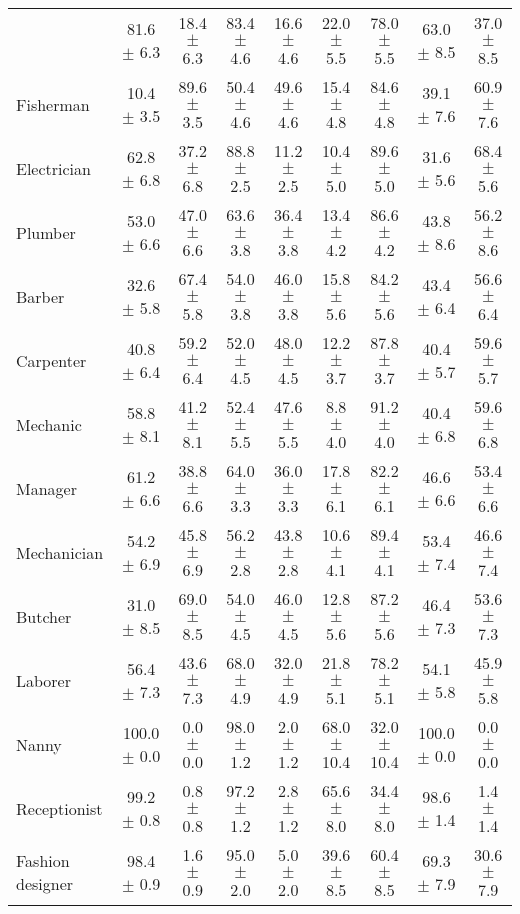 \begin{table*}[p]
{\begin{tabular}{l|cc|cc|cc|cc}
& 81.6 $\pm$ 6.3 & 18.4 $\pm$ 6.3
& 83.4 $\pm$ 4.6 & 16.6 $\pm$ 4.6
& 22.0 $\pm$ 5.5 & 78.0 $\pm$ 5.5
& 63.0 $\pm$ 8.5 & 37.0 $\pm$ 8.5
\\
Fisherman
& 10.4 $\pm$ 3.5 & 89.6 $\pm$ 3.5
& 50.4 $\pm$ 4.6 & 49.6 $\pm$ 4.6
& 15.4 $\pm$ 4.8 & 84.6 $\pm$ 4.8
& 39.1 $\pm$ 7.6 & 60.9 $\pm$ 7.6
\\
Electrician
& 62.8 $\pm$ 6.8 & 37.2 $\pm$ 6.8
& 88.8 $\pm$ 2.5 & 11.2 $\pm$ 2.5
& 10.4 $\pm$ 5.0 & 89.6 $\pm$ 5.0
& 31.6 $\pm$ 5.6 & 68.4 $\pm$ 5.6
\\
Plumber
& 53.0 $\pm$ 6.6 & 47.0 $\pm$ 6.6
& 63.6 $\pm$ 3.8 & 36.4 $\pm$ 3.8
& 13.4 $\pm$ 4.2 & 86.6 $\pm$ 4.2
& 43.8 $\pm$ 8.6 & 56.2 $\pm$ 8.6
\\
Barber
& 32.6 $\pm$ 5.8 & 67.4 $\pm$ 5.8
& 54.0 $\pm$ 3.8 & 46.0 $\pm$ 3.8
& 15.8 $\pm$ 5.6 & 84.2 $\pm$ 5.6
& 43.4 $\pm$ 6.4 & 56.6 $\pm$ 6.4
\\
Carpenter
& 40.8 $\pm$ 6.4 & 59.2 $\pm$ 6.4
& 52.0 $\pm$ 4.5 & 48.0 $\pm$ 4.5
& 12.2 $\pm$ 3.7 & 87.8 $\pm$ 3.7
& 40.4 $\pm$ 5.7 & 59.6 $\pm$ 5.7
\\
Mechanic
& 58.8 $\pm$ 8.1 & 41.2 $\pm$ 8.1
& 52.4 $\pm$ 5.5 & 47.6 $\pm$ 5.5
& 8.8 $\pm$ 4.0 & 91.2 $\pm$ 4.0
& 40.4 $\pm$ 6.8 & 59.6 $\pm$ 6.8
\\
Manager
& 61.2 $\pm$ 6.6 & 38.8 $\pm$ 6.6
& 64.0 $\pm$ 3.3 & 36.0 $\pm$ 3.3
& 17.8 $\pm$ 6.1 & 82.2 $\pm$ 6.1
& 46.6 $\pm$ 6.6 & 53.4 $\pm$ 6.6
\\
Mechanician
& 54.2 $\pm$ 6.9 & 45.8 $\pm$ 6.9
& 56.2 $\pm$ 2.8 & 43.8 $\pm$ 2.8
& 10.6 $\pm$ 4.1 & 89.4 $\pm$ 4.1
& 53.4 $\pm$ 7.4 & 46.6 $\pm$ 7.4
\\
Butcher
& 31.0 $\pm$ 8.5 & 69.0 $\pm$ 8.5
& 54.0 $\pm$ 4.5 & 46.0 $\pm$ 4.5
& 12.8 $\pm$ 5.6 & 87.2 $\pm$ 5.6
& 46.4 $\pm$ 7.3 & 53.6 $\pm$ 7.3
\\
Laborer
& 56.4 $\pm$ 7.3 & 43.6 $\pm$ 7.3
& 68.0 $\pm$ 4.9 & 32.0 $\pm$ 4.9
& 21.8 $\pm$ 5.1 & 78.2 $\pm$ 5.1
& 54.1 $\pm$ 5.8 & 45.9 $\pm$ 5.8
\\
Nanny
& 100.0 $\pm$ 0.0 & 0.0 $\pm$ 0.0
& 98.0 $\pm$ 1.2 & 2.0 $\pm$ 1.2
& 68.0 $\pm$ 10.4 & 32.0 $\pm$ 10.4
& 100.0 $\pm$ 0.0 & 0.0 $\pm$ 0.0
\\
Receptionist
& 99.2 $\pm$ 0.8 & 0.8 $\pm$ 0.8
& 97.2 $\pm$ 1.2 & 2.8 $\pm$ 1.2
& 65.6 $\pm$ 8.0 & 34.4 $\pm$ 8.0
& 98.6 $\pm$ 1.4 & 1.4 $\pm$ 1.4
\\
Fashion designer
& 98.4 $\pm$ 0.9 & 1.6 $\pm$ 0.9
& 95.0 $\pm$ 2.0 & 5.0 $\pm$ 2.0
& 39.6 $\pm$ 8.5 & 60.4 $\pm$ 8.5
& 69.3 $\pm$ 7.9 & 30.6 $\pm$ 7.9
\\

\end{tabular}}
\end{table*}
